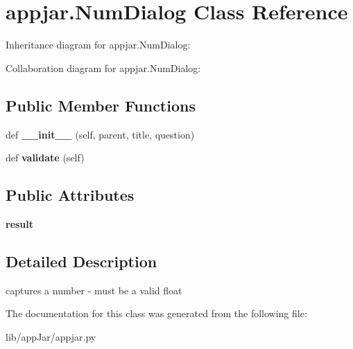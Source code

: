 \hypertarget{classappjar_1_1_num_dialog}{}\section{appjar.\+Num\+Dialog Class Reference}
\label{classappjar_1_1_num_dialog}


Inheritance diagram for appjar.\+Num\+Dialog\+:


Collaboration diagram for appjar.\+Num\+Dialog\+:
\subsection*{Public Member Functions}
\begin{DoxyCompactItemize}
\item 
\mbox{\label{classappjar_1_1_num_dialog_a50f59e275fc78934c101057dc13b4135}} 
def {\bfseries \+\_\+\+\_\+init\+\_\+\+\_\+} (self, parent, title, question)
\item 
\mbox{\label{classappjar_1_1_num_dialog_a167f8ecbcc072f85c350a3baf5e5ba5e}} 
def {\bfseries validate} (self)
\end{DoxyCompactItemize}
\subsection*{Public Attributes}
\begin{DoxyCompactItemize}
\item 
\mbox{\label{classappjar_1_1_num_dialog_a1dd8ffd703e29bd480a012f3fdec0c0d}} 
{\bfseries result}
\end{DoxyCompactItemize}


\subsection{Detailed Description}
\begin{DoxyVerb}captures a number - must be a valid float \end{DoxyVerb}
 

The documentation for this class was generated from the following file\+:\begin{DoxyCompactItemize}
\item 
lib/app\+Jar/appjar.\+py\end{DoxyCompactItemize}
